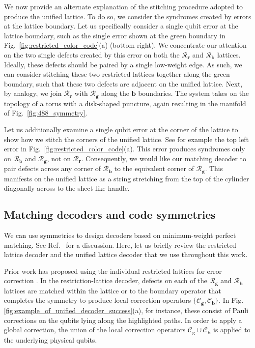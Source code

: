 \documentclass[a4paper,twocolumn,11pt,accepted=2024-12-23]{quantumarticle}
\begin{document}
We now provide an alternate explanation of the stitching procedure adopted to produce the unified lattice. To do so, we consider the syndromes created by errors at the lattice boundary. Let us specifically consider a single qubit error at the lattice boundary, such as the single error shown at the green boundary in Fig.~\ref{fig:restricted_color_code}(a) (bottom right). We concentrate our attention on the two single defects created by this error on both the $\mathcal{R}_\mathbf{r}$ and $\mathcal{R}_\mathbf{b}$ lattices. Ideally, these defects should be paired by a single low-weight edge. As such, we can consider stitching these two restricted lattices together along the green boundary, such that these two defects are adjacent on the unified lattice. Next, by analogy, we join $\mathcal{R}_\mathbf{r}$ with $\mathcal{R}_\mathbf{g}$ along the $\mathbf{b}$ boundaries. The system takes on the topology of a torus with a disk-shaped puncture, again resulting in the manifold of Fig.~\ref{fig:488_symmetry}. 

Let us additionally examine a single qubit error at the corner of the lattice to show how we stitch the corners of the unified lattice. See for example the top left error in Fig.~\ref{fig:restricted_color_code}(a). This error produces syndromes only on $\mathcal{R}_\mathbf{b}$ and $\mathcal{R}_\mathbf{g}$, not on $\mathcal{R}_\mathbf{r}$. Consequently, we would like our matching decoder to pair defects across any corner of $\mathcal{R}_\mathbf{b}$ to the equivalent corner of  $\mathcal{R}_\mathbf{g}$. This manifests on the unified lattice as a string stretching from the top of the cylinder diagonally across to the sheet-like handle.


\subsection{\label{ssec:decoding_on_unified_lattice} Matching decoders and code symmetries}

We can use symmetries to design decoders based on minimum-weight perfect matching. See Ref.~\cite{brown2022conservation} for a discussion. Here, let us briefly review the restricted-lattice decoder and the unified lattice decoder that we use throughout this work. 



Prior work has proposed using the individual restricted lattices for error correction \cite{kubica2023efficient}.
In the restriction-lattice decoder, defects on each of the $\mathcal{R}_{\mathbf{g}}$ and $\mathcal{R}_{\mathbf{b}}$ lattices are matched within the lattice or to the boundary operator that completes the symmetry to produce local correction operators $\{ \mathcal{C}_{\mathbf{g}} , \mathcal{C}_{\mathbf{b}} \}$. In Fig.\ref{fig:example_of_unified_decoder_success}(a), for instance, these consist of Pauli corrections on the qubits lying along the highlighted paths. In order to apply a global correction, the union of the local correction operators $\mathcal{C}_{\mathbf{g}} \cup \mathcal{C}_{\mathbf{b}}$ is applied to the underlying physical qubits.
\end{document}
